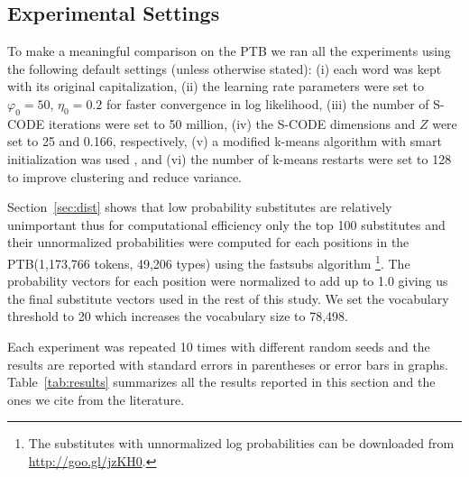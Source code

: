 \subsection{Experimental Settings}\label{sec:expset}

To make a meaningful comparison on the PTB we ran all the experiments
using the following default settings (unless otherwise stated): (i)
each word was kept with its original capitalization, (ii) the learning
rate parameters were set to $\varphi_0=50$, $\eta_0=0.2$ for faster
convergence in log likelihood, (iii) the number of S-CODE iterations
were set to 50 million, (iv) the S-CODE dimensions and $Z$ were set to
25 and 0.166, respectively, (v) a modified k-means algorithm with
smart initialization was used \cite{arthur2007k}, and (vi) the number
of k-means restarts were set to 128 to improve clustering and reduce
variance.

Section~\ref{sec:dist} shows that low probability substitutes are
relatively unimportant thus for computational efficiency only the top
100 substitutes and their unnormalized probabilities were computed for
each positions in the PTB(1,173,766 tokens, 49,206 types) using the
{\sc fastsubs} algorithm \cite{yuret2021fastsub}\footnote{The
  substitutes with unnormalized log probabilities can be downloaded
  from \mbox{\url{http://goo.gl/jzKH0}}.}.  The probability vectors
for each position were normalized to add up to 1.0 giving us the final
substitute vectors used in the rest of this study.  We set the
vocabulary threshold to 20 which increases the vocabulary size to
78,498.



Each experiment was repeated 10 times with different random seeds and
the results are reported with standard errors in parentheses or error
bars in graphs.  Table~\ref{tab:results} summarizes all the results
reported in this section and the ones we cite from the literature.

